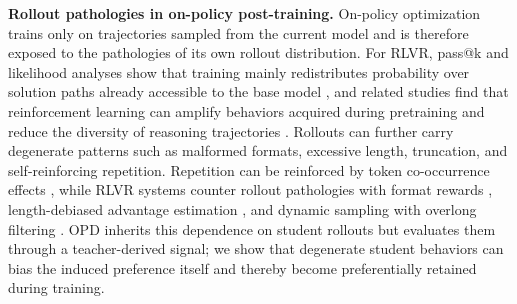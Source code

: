 \textbf{Rollout pathologies in on-policy post-training.}
On-policy optimization trains only on trajectories sampled from the current model and is therefore exposed to the pathologies of its own rollout distribution.
For RLVR, pass@k and likelihood analyses show that training mainly redistributes probability over solution paths already accessible to the base model \citep{yue2025does}, and related studies find that reinforcement learning can amplify behaviors acquired during pretraining \citep{zhao2025echochamberrlposttraining} and reduce the diversity of reasoning trajectories \citep{dang2025assessing}.
Rollouts can further carry degenerate patterns such as malformed formats, excessive length, truncation, and self-reinforcing repetition. Repetition can be reinforced by token co-occurrence effects \citep{yan2024understanding}, while RLVR systems counter rollout pathologies with format rewards \citep{guo2025deepseek}, length-debiased advantage estimation \citep{liu2025understandingr1zeroliketrainingcritical}, and dynamic sampling with overlong filtering \citep{yu2025dapoopensourcellmreinforcement}.
OPD inherits this dependence on student rollouts but evaluates them through a teacher-derived signal; we show that degenerate student behaviors can bias the induced preference itself and thereby become preferentially retained during training.
